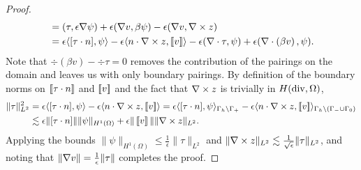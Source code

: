 \begin{proof}
\begin{align*}
&=(\tau, \epsilon \grad \psi) + \epsilon(\grad v,\beta \psi) - \epsilon(\grad v,\curl z)  \\
&=\epsilon \langle [\tau \cdot n],\psi \rangle - \epsilon  \langle n\cdot \curl z, \jump{v}\rangle-\epsilon(\div \tau, \psi) + \epsilon(\div \left(\beta v\right), \psi).
\end{align*}
Note that $\div(\beta v) - \div \tau = 0$ removes the contribution of the pairings on the domain and leaves us with only boundary pairings. By definition of the boundary norms on $\jump{\tau\cdot n}$ and $\jump{v}$ and the fact that $\curl z$ is trivially in $H({\rm div}, \Omega)$,
\begin{align*}
\|\tau\|_{L^2}^2 &=\epsilon \langle [\tau \cdot n],\psi \rangle -
\epsilon \langle n\cdot \curl z, \jump{v}\rangle = \epsilon \langle [\tau
  \cdot n],\psi \rangle_{\Gh \setminus \Gamma_+} - \epsilon
\langle n\cdot \curl z,\jump{v}\rangle_{\Gh \setminus
  \left(\Gamma_-\cup \Gamma_0\right)}\\ &\lesssim \epsilon \|[\tau
  \cdot n]\| \|\psi\|_{H^1(\Omega)} + \epsilon \| \jump{v}\|\| \curl z
\|_{L^2}.
\end{align*}
Applying the bounds $\|\psi\|_{H^1(\Omega)}  \leq \frac{1}{\epsilon}\|\tau\|_{L^2}$ and 
$\|\curl z\|_{L^2} \lesssim \frac{1}{\sqrt{\epsilon}}\|\tau\|_{L^2}$, and noting that $\|\grad v\| = \frac{1}{\epsilon}\|\tau\|$ completes the proof.
\end{proof}
%
%
%
